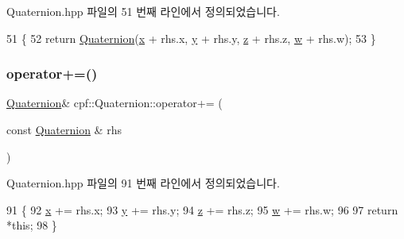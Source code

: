 Quaternion.\+hpp 파일의 51 번째 라인에서 정의되었습니다.


\begin{DoxyCode}
51                                                            \{
52             \textcolor{keywordflow}{return} \hyperlink{classcpf_1_1_quaternion_aae3cc98fcdb7a419a29db4ee988972bc}{Quaternion}(\hyperlink{classcpf_1_1_quaternion_a200f7bce4e673281af8cc7dd75cb0677}{x} + rhs.x, \hyperlink{classcpf_1_1_quaternion_a4fbade6e58be55a49c94e7f157988136}{y} + rhs.y, \hyperlink{classcpf_1_1_quaternion_ade9c41b717605118e5fdf95d96a843b4}{z} + rhs.z, \hyperlink{classcpf_1_1_quaternion_af312a196b39bb4903b876bc454ac15f8}{w} + rhs.w);
53         \}
\end{DoxyCode}
\mbox{\label{classcpf_1_1_quaternion_ac4720430dfd27c0f77b8eaa0f3439e55}} 
\subsubsection{\texorpdfstring{operator+=()}{operator+=()}}
{\footnotesize\ttfamily \hyperlink{classcpf_1_1_quaternion}{Quaternion}\& cpf\+::\+Quaternion\+::operator+= (\begin{DoxyParamCaption}\item[{const \hyperlink{classcpf_1_1_quaternion}{Quaternion} \&}]{rhs }\end{DoxyParamCaption})\hspace{0.3cm}{\ttfamily [inline]}}



Quaternion.\+hpp 파일의 91 번째 라인에서 정의되었습니다.


\begin{DoxyCode}
91                                                       \{
92             \hyperlink{classcpf_1_1_quaternion_a200f7bce4e673281af8cc7dd75cb0677}{x} += rhs.x;
93             \hyperlink{classcpf_1_1_quaternion_a4fbade6e58be55a49c94e7f157988136}{y} += rhs.y;
94             \hyperlink{classcpf_1_1_quaternion_ade9c41b717605118e5fdf95d96a843b4}{z} += rhs.z;
95             \hyperlink{classcpf_1_1_quaternion_af312a196b39bb4903b876bc454ac15f8}{w} += rhs.w;
96 
97             \textcolor{keywordflow}{return} *\textcolor{keyword}{this};
98         \}
\end{DoxyCode}
\mbox{\label{classcpf_1_1_quaternion_aa16967dd4f4d49018ef64e5b0e88b3fd}} 
